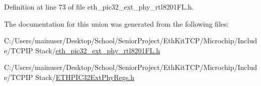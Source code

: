 Definition at line 73 of file eth\+\_\+pic32\+\_\+ext\+\_\+phy\+\_\+rtl8201\+F\+L.\+h.



The documentation for this union was generated from the following files\+:\begin{DoxyCompactItemize}
\item 
C\+:/\+Users/mainuser/\+Desktop/\+School/\+Senior\+Project/\+Eth\+Kit\+T\+C\+P/\+Microchip/\+Include/\+T\+C\+P\+I\+P Stack/\hyperlink{eth__pic32__ext__phy__rtl8201_f_l_8h}{eth\+\_\+pic32\+\_\+ext\+\_\+phy\+\_\+rtl8201\+F\+L.\+h}\item 
C\+:/\+Users/mainuser/\+Desktop/\+School/\+Senior\+Project/\+Eth\+Kit\+T\+C\+P/\+Microchip/\+Include/\+T\+C\+P\+I\+P Stack/\hyperlink{_e_t_h_p_i_c32_ext_phy_regs_8h}{E\+T\+H\+P\+I\+C32\+Ext\+Phy\+Regs.\+h}\end{DoxyCompactItemize}

